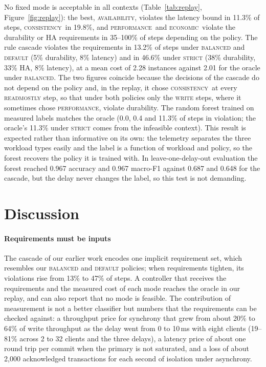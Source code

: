 \documentclass[smallextended]{svjour3}
\newcommand{\perf}{\textsc{performance}}
\newcommand{\cons}{\textsc{consistency}}
\newcommand{\avail}{\textsc{availability}}
\newcommand{\econ}{\textsc{economic}}
\begin{document}
No fixed mode is acceptable in all contexts (Table~\ref{tab:replay}, Figure~\ref{fig:replay}): the best, \avail, violates the latency bound in 11.3\% of steps, \cons\ in 19.8\%, and \perf\ and \econ\ violate the durability or HA requirements in 35--100\% of steps depending on the policy. The rule cascade violates the requirements in 13.2\% of steps under \textsc{balanced} and \textsc{default} (5\% durability, 8\% latency) and in 46.6\% under \textsc{strict} (38\% durability, 33\% HA, 8\% latency), at a mean cost of 2.28 instances against 2.01 for the oracle under \textsc{balanced}. The two figures coincide because the decisions of the cascade do not depend on the policy and, in the replay, it chose \cons\ at every \textsc{readmostly} step, so that under both policies only the \textsc{write} steps, where it sometimes chose \perf, violate durability. The random forest trained on measured labels matches the oracle (0.0, 0.4 and 11.3\% of steps in violation; the oracle's 11.3\% under \textsc{strict} comes from the infeasible context). This result is expected rather than informative on its own: the telemetry separates the three workload types easily and the label is a function of workload and policy, so the forest recovers the policy it is trained with. In leave-one-delay-out evaluation the forest reached 0.967 accuracy and 0.967 macro-F1 against 0.687 and 0.648 for the cascade, but the delay never changes the label, so this test is not demanding.

\section{Discussion}\label{sec:discussion}
\paragraph{Requirements must be inputs}
The cascade of our earlier work encodes one implicit requirement set, which resembles our \textsc{balanced} and \textsc{default} policies; when requirements tighten, its violations rise from 13\% to 47\% of steps. A controller that receives the requirements and the measured cost of each mode reaches the oracle in our replay, and can also report that no mode is feasible. The contribution of measurement is not a better classifier but numbers that the requirements can be checked against: a throughput price for synchrony that grew from about 20\% to 64\% of write throughput as the delay went from 0 to 10\,ms with eight clients (19--81\% across 2 to 32 clients and the three delays), a latency price of about one round trip per commit when the primary is not saturated, and a loss of about 2,000 acknowledged transactions for each second of isolation under asynchrony.
\end{document}
